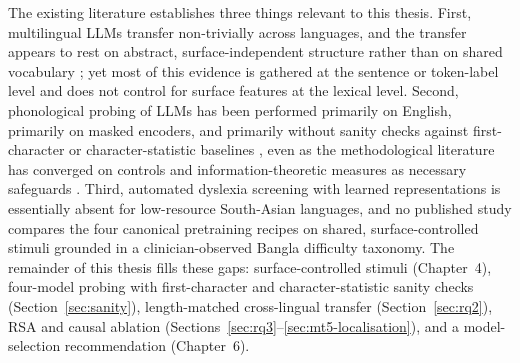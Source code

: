 The existing literature establishes three things relevant to this thesis. First, multilingual LLMs transfer non-trivially across languages, and the transfer appears to rest on abstract, surface-independent structure rather than on shared vocabulary \cite{pires2019mbert,conneau2020xlmr,k2020crosslingual,artetxe2020crosslingual}; yet most of this evidence is gathered at the sentence or token-label level and does not control for surface features at the lexical level. Second, phonological probing of LLMs has been performed primarily on English, primarily on masked encoders, and primarily without sanity checks against first-character or character-statistic baselines \cite{kann2018phonological,chrupala2019phonological,soulos2021structural}, even as the methodological literature has converged on controls and information-theoretic measures as necessary safeguards \cite{hewitt2019control,pimentel2020information,voita2020mdl,belinkov2022probing}. Third, automated dyslexia screening with learned representations is essentially absent for low-resource South-Asian languages, and no published study compares the four canonical pretraining recipes on shared, surface-controlled stimuli grounded in a clinician-observed Bangla difficulty taxonomy. The remainder of this thesis fills these gaps: surface-controlled stimuli (Chapter~4), four-model probing with first-character and character-statistic sanity checks (Section~\ref{sec:sanity}), length-matched cross-lingual transfer (Section~\ref{sec:rq2}), RSA and causal ablation (Sections~\ref{sec:rq3}--\ref{sec:mt5-localisation}), and a model-selection recommendation (Chapter~6).
